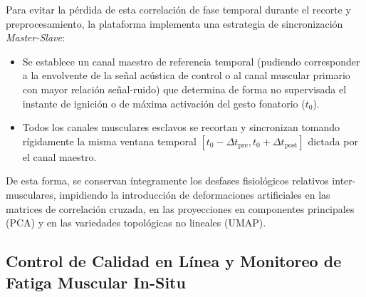 Para evitar la pérdida de esta correlación de fase temporal durante el recorte y preprocesamiento, la plataforma implementa una estrategia de sincronización \textit{Master-Slave}:
\begin{itemize}
    \item Se establece un canal maestro de referencia temporal (pudiendo corresponder a la envolvente de la señal acústica de control o al canal muscular primario con mayor relación señal-ruido) que determina de forma no supervisada el instante de ignición o de máxima activación del gesto fonatorio ($t_0$).
    \item Todos los canales musculares esclavos se recortan y sincronizan tomando rígidamente la misma ventana temporal $[t_0 - \Delta t_{\text{pre}}, t_0 + \Delta t_{\text{post}}]$ dictada por el canal maestro.
\end{itemize}
De esta forma, se conservan íntegramente los desfases fisiológicos relativos inter-musculares, impidiendo la introducción de deformaciones artificiales en las matrices de correlación cruzada, en las proyecciones en componentes principales (PCA) y en las variedades topológicas no lineales (UMAP).

\subsection{Control de Calidad en Línea y Monitoreo de Fatiga Muscular In-Situ}
\label{subsec:control_calidad}

